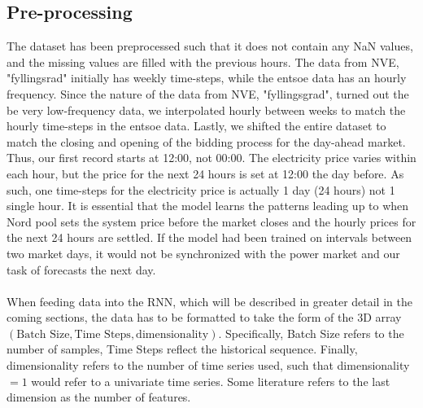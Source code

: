 \documentclass
[twocolumn,
secnumarabic,
nobibnotes,
aps,
prl,
reprint,
groupedaddress,
amsmath,
amssymb,
]{revtex4-2}
\begin{document}
\subsection{Pre-processing}
The dataset has been preprocessed such that it does not contain any NaN values, and the missing values are filled with the previous hours. The data from NVE, "fyllingsrad" initially has weekly time-steps, while the entsoe data has an hourly frequency. Since the nature of the data from NVE, "fyllingsgrad", turned out the be very low-frequency data, we interpolated hourly between weeks to match the hourly time-steps in the entsoe data. Lastly, we shifted the entire dataset to match the closing and opening of the bidding process for the day-ahead market. Thus, our first record starts at 12:00, not 00:00. The electricity price varies within each hour, but the price for the next 24 hours is set at 12:00 the day before. As such, one time-steps for the electricity price is actually 1 day (24 hours) not 1 single hour. It is essential that the model learns the patterns leading up to when Nord pool sets the system price before the market closes and the hourly prices for the next 24 hours are settled. If the model had been trained on intervals between two market days, it would not be synchronized with the power market and our task of forecasts the next day.   
\\\\
When feeding data into the RNN, which will be described in greater detail in the coming sections, the data has to be formatted to take the form of the 3D array $\left(\text{Batch Size}, \text{Time Steps}, \text{dimensionality}\right)$. Specifically, Batch Size refers to the number of samples, Time Steps reflect the historical sequence. Finally, dimensionality refers to the number of time series used, such that dimensionality $= 1$ would refer to a univariate time series. Some literature refers to the last dimension as the number of features. 
\end{document}
